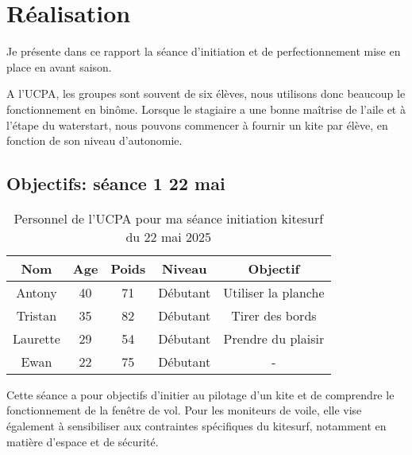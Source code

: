 \documentclass[11pt,a4paper]{report}
\begin{document}
\FloatBarrier
\section{Réalisation}
Je présente dans ce rapport la séance d'initiation et de perfectionnement
mise en place en avant saison.

A l'UCPA, les groupes sont souvent de six élèves, nous
utilisons donc beaucoup le fonctionnement en bin\^ome. 
Lorsque le stagiaire a une bonne maîtrise de l'aile et
à l'étape du waterstart, nous pouvons commencer à fournir
un kite par élève, en fonction de son niveau d'autonomie.
\subsection{Objectifs: séance 1 22 mai}
\begin{table}[h]
\centering
\begin{tabular}{|c|c|c|c|c|}
        \hline
        \textbf{Nom} & \textbf{Age} & \textbf{Poids}& \textbf{Niveau}     &  \textbf{Objectif} \\ 
        \hline
        Antony        &  40          &  71           &   Débutant          & Utiliser la planche  \\
        Tristan       &  35          & 82            &  Débutant           & Tirer des bords  \\
        Laurette      &  29          & 54            &  Débutant           & Prendre du plaisir \\
        Ewan          &  22          & 75            & Débutant            &  -  \\
        \hline
\end{tabular}
\caption{Personnel de l'UCPA pour ma séance initiation kitesurf du 22 mai 2025\label{stagiaires_table}}
\end{table}
Cette séance a pour objectifs d’initier au pilotage d’un kite et
de comprendre le fonctionnement de la fenêtre de vol. 
Pour les moniteurs de voile, elle vise également à 
sensibiliser aux contraintes spécifiques du kitesurf, 
notamment en matière d’espace et de sécurité.
 
\end{document}
